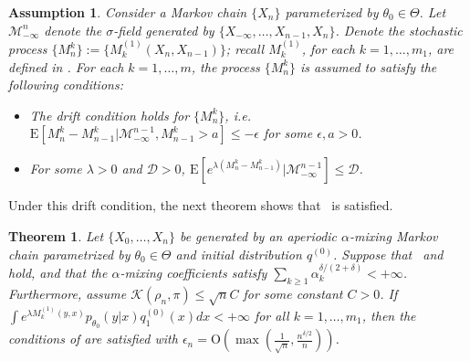 \documentclass[11pt]{amsart}
\newcommand{\E}{\mathrm{E}}
\newtheorem{theorem}{Theorem}[section]
\newtheorem{assumption}{Assumption}[section]
\begin{document}
\begin{assumption}\label{assume:hajek}
Consider a Markov chain $\{X_n\}$ parameterized by $\theta_0 \in \Theta$.  Let $\mathcal{M}_{-\infty}^n$ denote the $\sigma$-field generated by $\{X_{-\infty},\dots,X_{n-1},X_n\}$. Denote the stochastic process $\{M^k_{n}\}:=\{M^{(1)}_k(X_n,X_{n-1})\}$;  recall $M^{(1)}_k$, for each $k=1,\ldots,m_1$, are defined in . For each $k =1,\ldots,m$, the process $\{M^k_{n}\}$ is assumed to satisfy the following conditions:
\begin{itemize}
    \item The drift condition holds for $\{M^k_{n}\}$, i.e. $\E\left[M^k_{n}-M^k_{n-1}|\mathcal{M}_{-\infty}^{n-1}, M^k_{n-1}>a\right]\leq -\epsilon$ for some $\epsilon,a>0$.
    \item For some $\lambda>0$ and $\mathcal{D}>0$, $\E\left[e^{\lambda(M^k_{n}-M^k_{n-1})}|\mathcal{M}_{-\infty}^{n-1}\right]\leq \mathcal {D}$. 
\end{itemize}
\end{assumption}

Under this drift condition, the next theorem shows that~ is satisfied. 

\begin{theorem} \label{thm:gen-nonstationary-hajek}
  Let $\{X_0,\ldots,X_n\}$ be generated by an aperiodic $\alpha$-mixing Markov chain parametrized by $\theta_0 \in \Theta$ and initial distribution $q^{(0)}$. Suppose that~ and  hold, and that the $\alpha$-mixing coefficients satisfy $\sum_{k \geq 1} \alpha_k^{\delta/(2+\delta)} < +\infty$. Furthermore, assume $\mathcal{K}(\rho_n,\pi)\leq \sqrt{n}C$ for some constant $C>0$. If $\int e^{\lambda M^{(1)}_k(y,x)}p_{\theta_0}(y|x)q_1^{(0)}(x) dx < +\infty$ for all $k=1,\ldots,m_1$, then the conditions of  are satisfied with $\epsilon_n=\mathrm{O} \left(\max(\frac{1}{\sqrt{n}},\frac{n^{\delta/2}}{n})\right)$.
\end{theorem}
\end{document}
